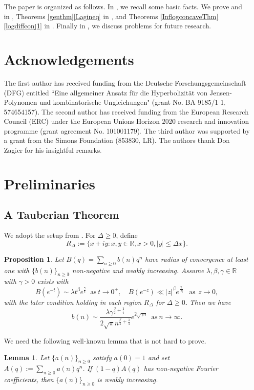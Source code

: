 \documentclass[11pt,reqno,a4paper]{amsart}
\renewcommand{\b}{\beta}
\newcommand{\g}{\gamma}
\renewcommand{\l}{\lambda}
\renewcommand{\(}{\left\(}
\renewcommand{\)}{\right\)}
\numberwithin{equation}{section}
\theoremstyle{plain}
\newtheorem{lemma}[theorem]{Lemma}
\newtheorem{proposition}[theorem]{Proposition}
\theoremstyle{definition} %
\numberwithin{equation}{section}
\begin{document}
The paper is organized as follows. In , we recall some basic facts. We prove  and  in , Theorems \ref{genthm}\textendash\ref{Lagineq} in , and Theorems \ref{InflogconcaveThm}\textendash\ref{logdiffconj1} in . Finally in , we discuss problems for future research.






\section*{Acknowledgements}
The first author has received funding from the Deutsche Forschungsgemeinschaft (DFG) entitled ``Eine allgemeiner Ansatz für die Hyperbolizität von Jensen-Polynomen und kombinatorische Ungleichungen" (grant No. BA 9185/1-1, 574654157). The second author has received funding from the European Research Council (ERC) under the European Unions Horizon 2020 research and innovation programme (grant agreement No. 101001179). The third author was supported by a grant from the Simons Foundation (853830, LR). The authors thank Don Zagier for his insightful remarks.






\section{Preliminaries}\label{sec0}


\subsection{A Tauberian Theorem} We adopt the setup from \cite[Theorem 1.1]{BJM}. 
For $\Delta\ge 0$, define 
\[
R_{\Delta}:=\{x+iy:x,y\in \mathbb{R}, x>0, |y|\le \Delta x\}.
\]
\begin{proposition}\label{sec0prop1}%
	Let $B(q)=\sum_{n\ge 0}b(n)q^n$ have radius of convergence at least one with $\{b(n)\}_{n\ge 0}$ non-negative and weakly increasing. Assume $\l,\b,\g\in \mathbb{R}$ with $\g>0$ exists with
	\begin{equation}\label{sec0prop1eqn1}
	B\left(e^{-t}\right)\sim \l t^{\b}e^{\frac \g t}\ \text{ as}\ t\to 0^{+},\quad B\left(e^{-z}\right)\ll |z|^\b e^{\frac{\g}{|z|}}\ \ \text{ as}\ \ z\to 0,
	\end{equation}
	with the later condition holding in each region $R_{\Delta}$ for $\Delta\ge 0$. Then we have
	\[
	b(n)\sim \frac{\l \g^{\frac \b2+\frac 14}}{2\sqrt{\pi}n^{\frac \b2+\frac 34}}e^{2\sqrt{\g n}}\ \text{ as}\ n\to \infty.
	\]
\end{proposition}
 We need the following well-known lemma that is not hard to prove.
\begin{lemma}\label{elem}
Let $\{a(n)\}_{n\ge 0}$ satisfy $a(0)=1$ and set $A(q):=\sum_{n\ge 0}a(n)q^n$. If $(1-q)A(q)$ has non-negative Fourier coefficients, then $\{a(n)\}_{n\ge 0}$ is weakly increasing.
\end{lemma}
\end{document}
